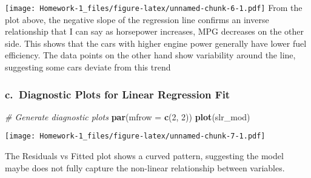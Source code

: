 \documentclass[
]{article}
\newenvironment{Shaded}{\begin{snugshade}}{\end{snugshade}}
\newcommand{\AttributeTok}[1]{\textcolor[rgb]{0.13,0.29,0.53}{#1}}
\newcommand{\CommentTok}[1]{\textcolor[rgb]{0.56,0.35,0.01}{\textit{#1}}}
\newcommand{\DecValTok}[1]{\textcolor[rgb]{0.00,0.00,0.81}{#1}}
\newcommand{\FunctionTok}[1]{\textcolor[rgb]{0.13,0.29,0.53}{\textbf{#1}}}
\newcommand{\NormalTok}[1]{#1}
\newcommand{\SpecialCharTok}[1]{\textcolor[rgb]{0.81,0.36,0.00}{\textbf{#1}}}
\newcommand{\StringTok}[1]{\textcolor[rgb]{0.31,0.60,0.02}{#1}}
\begin{document}
\begin{Shaded}
\end{Shaded}

\texttt{[image: Homework-1\_files/figure-latex/unnamed-chunk-6-1.pdf]}
From the plot above, the negative slope of the regression line confirms
an inverse relationship that I can say as horsepower increases, MPG
decreases on the other side. This shows that the cars with higher engine
power generally have lower fuel efficiency. The data points on the other
hand show variability around the line, suggesting some cars deviate from
this trend

\subsubsection{c.~Diagnostic Plots for Linear Regression
Fit}\label{c.-diagnostic-plots-for-linear-regression-fit}

\begin{Shaded}
\begin{Highlighting}[]
\CommentTok{\# Generate diagnostic plots}
\FunctionTok{par}\NormalTok{(}\AttributeTok{mfrow =} \FunctionTok{c}\NormalTok{(}\DecValTok{2}\NormalTok{, }\DecValTok{2}\NormalTok{))}
\FunctionTok{plot}\NormalTok{(slr\_mod)}
\end{Highlighting}
\end{Shaded}

\texttt{[image: Homework-1\_files/figure-latex/unnamed-chunk-7-1.pdf]}

The Residuals vs Fitted plot shows a curved pattern, suggesting the
model maybe does not fully capture the non-linear relationship between
variables.
\end{document}
